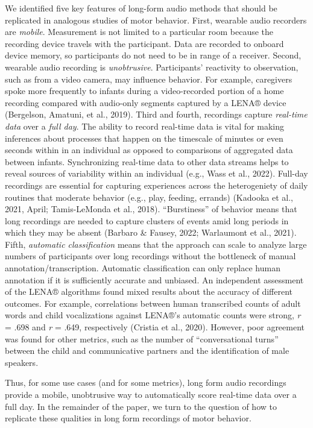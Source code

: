 \documentclass[
  man]{apa6}
\begin{document}
We identified five key features of long-form audio methods that should be replicated in analogous studies of motor behavior. First, wearable audio recorders are \emph{mobile}. Measurement is not limited to a particular room because the recording device travels with the participant. Data are recorded to onboard device memory, so participants do not need to be in range of a receiver. Second, wearable audio recording is \emph{unobtrusive}. Participants' reactivity to observation, such as from a video camera, may influence behavior. For example, caregivers spoke more frequently to infants during a video-recorded portion of a home recording compared with audio-only segments captured by a LENA® device (Bergelson, Amatuni, et al., 2019). Third and fourth, recordings capture \emph{real-time data} over a \emph{full day}. The ability to record real-time data is vital for making inferences about processes that happen on the timescale of minutes or even seconds within in an individual as opposed to comparisons of aggregated data between infants. Synchronizing real-time data to other data streams helps to reveal sources of variability within an individual (e.g., Wass et al., 2022). Full-day recordings are essential for capturing experiences across the heterogeniety of daily routines that moderate behavior (e.g., play, feeding, errands) (Kadooka et al., 2021, April; Tamis-LeMonda et al., 2018). ``Burstiness'' of behavior means that long recordings are needed to capture clusters of events amid long periods in which they may be absent (Barbaro \& Fausey, 2022; Warlaumont et al., 2021). Fifth, \emph{automatic classification} means that the approach can scale to analyze large numbers of participants over long recordings without the bottleneck of manual annotation/transcription. Automatic classification can only replace human annotation if it is sufficiently accurate and unbiased. An independent assessment of the LENA® algorithms found mixed results about the accuracy of different outcomes. For example, correlations between human transcribed counts of adult words and child vocalizations against LENA®'s automatic counts were strong, \emph{r} = .698 and \emph{r} = .649, respectively (Cristia et al., 2020). However, poor agreement was found for other metrics, such as the number of ``conversational turns'' between the child and communicative partners and the identification of male speakers.

Thus, for some use cases (and for some metrics), long form audio recordings provide a mobile, unobtrusive way to automatically score real-time data over a full day. In the remainder of the paper, we turn to the question of how to replicate these qualities in long form recordings of motor behavior.
\end{document}

